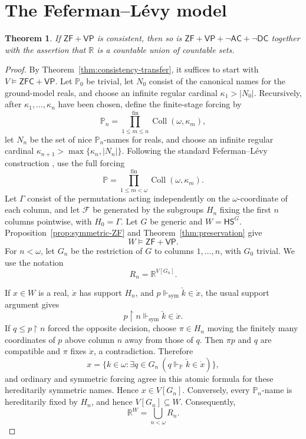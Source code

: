 \documentclass[11pt,a4paper]{amsart}
\newcommand{\VP}{\mathsf{VP}}
\newcommand{\AC}{\mathsf{AC}}
\newcommand{\ZF}{\mathsf{ZF}}
\newcommand{\ZFC}{\mathsf{ZFC}}
\newcommand{\HS}{\mathsf{HS}}
\newcommand{\forcesS}{\Vdash_{\mathrm{sym}}}
\newcommand{\restr}{\mathbin{\upharpoonright}}
\newcommand{\Coll}{\operatorname{Coll}}
\newcommand{\DC}{\mathsf{DC}}
\theoremstyle{plain}
\newtheorem{theorem}{Theorem}[section]
\theoremstyle{definition}
\theoremstyle{remark}
\begin{document}
\begingroup

\section{The Feferman--L\'evy model}\label{sec:FL}

\begin{theorem}\label{thm:FL}
If $\ZF+\VP$ is consistent, then so is $\ZF+\VP+\neg\AC+\neg\DC$ together with the assertion that $\mathbb R$ is a countable union of countable sets.
\end{theorem}

\begin{proof}
By Theorem~\ref{thm:consistency-transfer}, it suffices to start with $V\models\ZFC+\VP$.  {Let $\mathbb P_0$ be trivial, let $N_0$ consist of the canonical names for the ground-model reals, and choose an infinite regular cardinal $\kappa_1>|N_0|$.  Recursively, after $\kappa_1,\ldots,\kappa_n$ have been chosen, define the finite-stage forcing by
\[
\mathbb P_n=\prod_{1\leq m\leq n}^{\mathrm{fin}}\Coll(\omega,\kappa_m),
\]
let $N_n$ be the set of nice $\mathbb P_n$-names for reals, and choose an infinite regular cardinal $\kappa_{n+1}>\max\{\kappa_n,|N_n|\}$.}  Following the standard Feferman--L\'evy construction \cite[Theorem~10.6]{Jech}, use the full forcing
\[
{\mathbb P=\prod_{1\leq m<\omega}^{\mathrm{fin}}\Coll(\omega,\kappa_m).}
\]
Let $\Gamma$ consist of the permutations acting independently on the $\omega$-coordinate of each column, and let $\mathcal F$ be generated by the subgroups $H_n$ fixing the first $n$ columns pointwise, with $H_0=\Gamma$.  Let $G$ be generic and $W=\HS^G$.  Proposition~\ref{prop:symmetric-ZF} and Theorem~\ref{thm:preservation} give
\[
W\models\ZF+\VP.
\]
For $n<\omega$, let $G_n$ be the restriction of $G$ to columns $1,\ldots,n$, with $G_0$ trivial.  We use the notation
\[
{R_n=\mathbb R^{V[G_n]}.}
\]

If $x\in W$ is a real, $\dot x$ has support $H_n$, and $p\forcesS\check k\in\dot x$, the usual support argument gives
\[
p\restr n\forcesS\check k\in\dot x.
\]
If $q\leq p\restr n$ forced the opposite decision, choose $\pi\in H_n$ moving the finitely many coordinates of $p$ above column $n$ away from those of $q$.  Then $\pi p$ and $q$ are compatible and $\pi$ fixes $\dot x$, a contradiction.  {Therefore
\[
x=\{k\in\omega:\exists q\in G_n\ (q\Vdash_{\mathbb P}\check k\in\dot x)\},
\]
and ordinary and symmetric forcing agree in this atomic formula for these hereditarily symmetric names.  Hence $x\in V[G_n]$.  Conversely, every $\mathbb P_n$-name is hereditarily fixed by $H_n$, and hence $V[G_n]\subseteq W$.}  Consequently,
\[
\mathbb R^W=\bigcup_{n<\omega}R_n.
\]


\end{proof}
\end{document}
